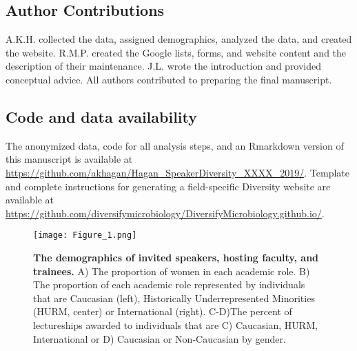 \documentclass[10pt,]{article}
\begin{document}
\subsection{Author Contributions}\label{author-contributions}

A.K.H. collected the data, assigned demographics, analyzed the data, and
created the website. R.M.P. created the Google lists, forms, and website
content and the description of their maintenance. J.L. wrote the
introduction and provided conceptual advice. All authors contributed to
preparing the final manuscript.

\subsection{Code and data
availability}\label{code-and-data-availability}

The anonymized data, code for all analysis steps, and an Rmarkdown
version of this manuscript is available at
\url{https://github.com/akhagan/Hagan_SpeakerDiversity_XXXX_2019/}.
Template and complete instructions for generating a field-specific
Diversity website are available at
\url{https://github.com/diversifymicrobiology/DiversifyMicrobiology.github.io/}.

\begin{figure}
\centering
\texttt{[image: Figure\_1.png]}
\caption{\textbf{The demographics of invited speakers, hosting faculty,
and trainees.} A) The proportion of women in each academic role. B) The
proportion of each academic role represented by individuals that are
Caucasian (left), Historically Underrepresented Minorities (HURM,
center) or International (right). C-D)The percent of lectureships
awarded to individuals that are C) Caucasian, HURM, International or D)
Caucasian or Non-Caucasian by gender.}
\end{figure}

\newpage
\end{document}
